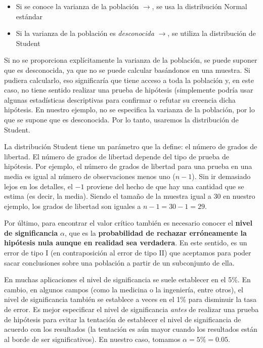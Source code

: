 \documentclass[
]{book}
\providecommand{\tightlist}{%
  \setlength{\itemsep}{0pt}\setlength{\parskip}{0pt}}
\begin{document}
\begin{itemize}
\tightlist
\item
  Si se conoce la varianza de la población \(\rightarrow\), se usa la distribución Normal estándar
\item
  Si la varianza de la población es \emph{desconocida} \(\rightarrow\), se utiliza la distribución de Student
\end{itemize}

Si no se proporciona explícitamente la varianza de la población, se puede suponer que es desconocida, ya que no se puede calcular basándonos en una muestra. Si pudiera calcularlo, eso significaría que tiene acceso a toda la población y, en este caso, no tiene sentido realizar una prueba de hipótesis (simplemente podría usar algunas estadísticas descriptivas para confirmar o refutar su creencia dicha hipótesis. En nuestro ejemplo, no se especifica la varianza de la población, por lo que se supone que es desconocida. Por lo tanto, usaremos la distribución de Student.

La distribución Student tiene un parámetro que la define: el número de grados de libertad. El número de grados de libertad depende del tipo de prueba de hipótesis. Por ejemplo, el número de grados de libertad para una prueba en una media es igual al número de observaciones menos uno (\(n-1\)). Sin ir demasiado lejos en los detalles, el \(- 1\) proviene del hecho de que hay una cantidad que se estima (es decir, la media). Siendo el tamaño de la muestra igual a 30 en nuestro ejemplo, los grados de libertad son iguales a \(n -1 = 30-1=29\).

Por último, para encontrar el valor crítico también es necesario conocer el \textbf{nivel de significancia} \(\alpha\), que es la \textbf{probabilidad de rechazar erróneamente la hipótesis nula aunque en realidad sea verdadera}. En este sentido, es un error de tipo I (en contraposición al error de tipo II) que aceptamos para poder sacar conclusiones sobre una población a partir de un subconjunto de ella.

En muchas aplicaciones el nivel de significancia se suele establecer en el 5\%. En cambio, en algunos campos (como la medicina o la ingeniería, entre otros), el nivel de significancia también se establece a veces en el 1\% para disminuir la tasa de error. Es mejor especificar el nivel de significancia \emph{antes} de realizar una prueba de hipótesis para evitar la tentación de establecer el nivel de significancia de acuerdo con los resultados (la tentación es aún mayor cuando los resultados están al borde de ser significativos). En nuestro caso, tomamos \(\alpha = 5\% = 0.05\).
\end{document}
